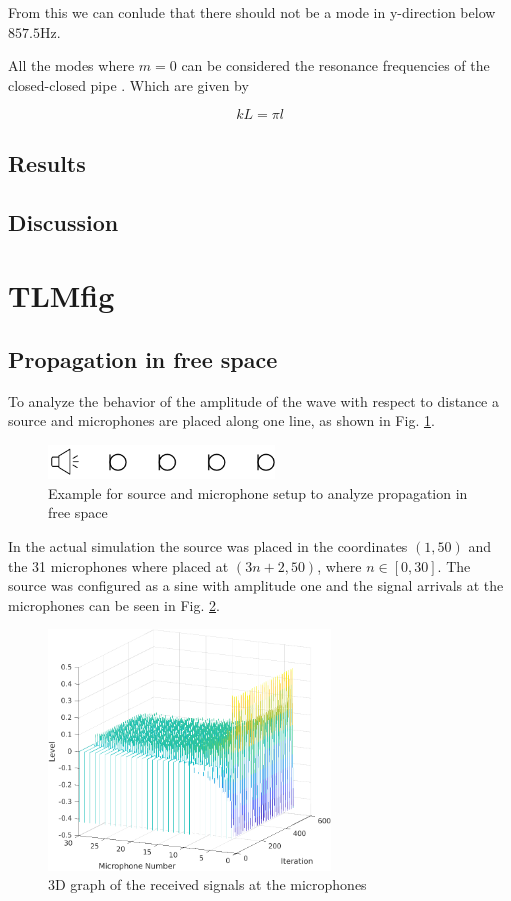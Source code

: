 \documentclass[twocolumn]{article}
\begin{document}
From this we can conlude that there should not be a mode in y-direction below $857.5\text{Hz}$.

All the modes where $m=0$ can be considered the resonance frequencies of the closed-closed
pipe \cite{PipesResonators}.
Which are given by

\begin{equation}
    kL = \pi l
\end{equation}

\subsection{Results}

\subsection{Discussion}

\section{TLMfig}
\subsection{Propagation in free space}
To analyze the behavior of the amplitude of the wave with respect to distance a source and
microphones are placed along one line, as shown in Fig. \ref{fig_3_1_example}.

\begin{figure}[H]
    \centering
    \includegraphics[width=60mm]{./Images/tlmfig_3_1.png}
    \caption{Example for source and microphone setup to analyze propagation in free space}
    \label{fig_3_1_example}
\end{figure}

In the actual simulation the source was placed in the coordinates $\left(1,50\right)$ and
the 31 microphones where placed at $\left(3n+2,50\right)$, where $n\in\left[0,30\right]$.
The source was configured as a sine with amplitude one and the signal arrivals at the
microphones can be seen in Fig. \ref{fig_3_1_3D}.

\begin{figure}[H]
    \centering
    \includegraphics[width=75mm]{./Images/3_1_3d.png}
    \caption{3D graph of the received signals at the microphones}
    \label{fig_3_1_3D}
\end{figure}
\end{document}
